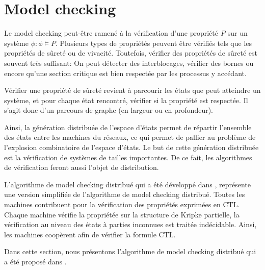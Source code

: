 \section{Model checking}\label{mcd}
Le model checking peut-être ramené à la vérification d'une propriété \emph{P} sur un système $\phi : \phi \models P$. Plusieurs types de propriétés peuvent être vérifiés tels que les propriétés de sûreté ou de vivacité. Toutefois, vérifier des propriétés de sûreté est souvent très suffisant: On peut détecter des interblocages, vérifier des bornes ou encore qu'une section critique est bien respectée par les processus y accédant. 


Vérifier une propriété de sûreté revient à parcourir les états que peut atteindre un système, et pour chaque état rencontré, vérifier si la propriété est respectée. Il s'agit donc d'un parcours de graphe (en largeur ou en profondeur).

Ainsi, la génération distribuée de l'espace d'états permet de répartir l'ensemble des états entre les machines du réseaux, ce qui permet de pallier au problème de l'explosion combinatoire de l'espace d'états. Le but de cette génération distribuée est la vérification de systèmes de tailles importantes. De ce fait, les algorithmes de vérification feront aussi l'objet de distribution. 

L'algorithme de model checking distribué qui a été développé dans \citep{depriester2011bouneb}, représente une version simplifiée de l'algorithme de model checking distribué. Toutes les machines contribuent pour la vérification des propriétés exprimées en CTL. Chaque machine vérifie la propriétée sur la structure de Kripke partielle, la vérification au niveau des états à parties inconnues est traitée indécidable. Ainsi, les machines coopèrent afin de vérifier la formule CTL. 

Dans cette section, nous présentons l'algorithme de model checking distribué qui a été proposé dans \citep{depriester2011bouneb}.


